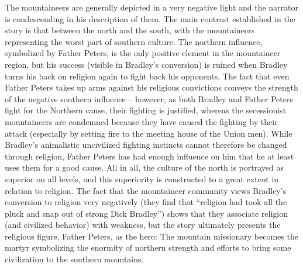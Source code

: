 The mountaineers are generally depicted in a very negative light and the narrator is condescending in his description of them. The main contrast established in the story is that between the north and the south, with the mountaineers representing the worst part of southern culture. The northern influence, symbolized by Father Peters, is the only positive element in the mountaineer region, but his success (visible in Bradley’s conversion) is ruined when Bradley turns his back on religion again to fight back his opponents. The fact that even Father Peters takes up arms against his religious convictions conveys the strength of the negative southern influence – however, as both Bradley and Father Peters fight for the Northern cause, their fighting is justified, whereas the secessionist mountaineers are condemned because they have caused the fighting by their attack (especially by setting fire to the meeting house of the Union men). While Bradley’s animalistic uncivilized fighting instincts cannot therefore be changed through religion, Father Peters has had enough influence on him that he at least uses them for a good cause. All in all, the culture of the north is portrayed as superior on all levels, and this superiority is constructed to a great extent in relation to religion. The fact that the mountaineer community views Bradley’s conversion to religion very negatively (they find that “religion had took all the pluck and snap out of strong Dick Bradley”) shows that they associate religion (and civilized behavior) with weakness, but the story ultimately presents the religious figure, Father Peters, as the hero: The mountain missionary becomes the martyr symbolizing the enormity of northern strength and efforts to bring some civilization to the southern mountains.

